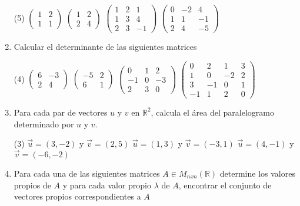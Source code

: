 \documentclass[letterpaper,11pt]{article}
\begin{document}
\begin{enumerate}
\begin{tasks}(5)
\task $\begin{pmatrix} 1 & 2 \\ 1 & 1 \end{pmatrix}$     
\task $\begin{pmatrix} 1 & 2 \\ 2 & 4 \end{pmatrix}$ 
\task $\begin{pmatrix} 1 & 2 & 1 \\ 1 & 3 & 4 \\ 2 & 3 & -1 \end{pmatrix}$
\task $\begin{pmatrix} 0 & -2 & 4 \\ 1 & 1 & -1 \\ 2 & 4 & -5 \end{pmatrix}$
\end{tasks}



\item Calcular el determinante de las siguientes matrices 
\begin{tasks}(4)
\task $\begin{pmatrix} 6 & -3 \\ 2 & 4 \end{pmatrix}$
\task $\begin{pmatrix} -5 & 2 \\ 6 & 1 \end{pmatrix}$ 
\task $\begin{pmatrix} 0 & 1 & 2 \\ -1 & 0 & -3 \\ 2 & 3 & 0 \end{pmatrix}$ 
\task $\begin{pmatrix} 0 & 2 & 1 & 3 \\ 1 & 0 & -2 & 2 \\ 3 & -1 & 0 & 1 \\ -1 & 1 & 2 & 0 \end{pmatrix}$ 
\end{tasks}
\item Para cada par de vectores $u$ y $v$ en $\mathbb{R}^2$, calcula el área del paralelogramo determinado por $u$ y $v$.

\begin{tasks}(3)
\task $\vec{u} = (3,-2)$ y $\vec{v} = (2,5)$
\task $\vec{u}  = (1,3)$ y $\vec{v}  = (-3,1)$ 
\task $\vec{u}  = (4,-1)$ y $\vec{v}  = (-6,-2)$
\end{tasks}
\item Para cada una de las siguientes matrices $A \in M_{nxn}(\mathbb{R})$ determine los valores propios de $A$ y para cada valor propio $\lambda$ de $A$, encontrar el conjunto de vectores propios correspondientes a $A$


\end{enumerate}
\end{document}
